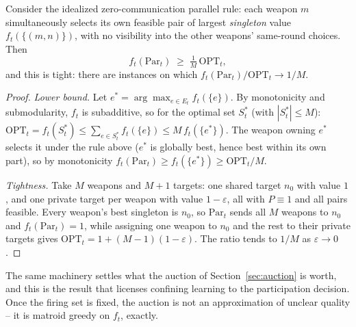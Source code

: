 \begin{proposition}
\label{prop:par-linear}
Consider the idealized zero-communication parallel rule: each weapon $m$ simultaneously selects its own feasible pair of largest \emph{singleton} value $f_t(\{(m,n)\})$, with no visibility into the other weapons' same-round choices. Then
\begin{equation}
f_t(\mathrm{Par}_t) \;\geq\; \tfrac{1}{M}\,\text{OPT}_t,
\end{equation}
and this is tight: there are instances on which $f_t(\mathrm{Par}_t)/\text{OPT}_t \to 1/M$.
\end{proposition}
\begin{proof}
\emph{Lower bound.} Let $e^* = \arg\max_{e \in E_t} f_t(\{e\})$. By monotonicity and submodularity, $f_t$ is subadditive, so for the optimal set $S^*_t$ (with $|S^*_t|\leq M$): $\text{OPT}_t = f_t(S^*_t) \leq \sum_{e\in S^*_t} f_t(\{e\}) \leq M\, f_t(\{e^*\})$. The weapon owning $e^*$ selects it under the rule above ($e^*$ is globally best, hence best within its own part), so by monotonicity $f_t(\mathrm{Par}_t) \geq f_t(\{e^*\}) \geq \text{OPT}_t / M$.

\emph{Tightness.} Take $M$ weapons and $M{+}1$ targets: one shared target $n_0$ with value $1$, and one private target per weapon with value $1-\varepsilon$, all with $P \equiv 1$ and all pairs feasible. Every weapon's best singleton is $n_0$, so $\mathrm{Par}_t$ sends all $M$ weapons to $n_0$ and $f_t(\mathrm{Par}_t)=1$, while assigning one weapon to $n_0$ and the rest to their private targets gives $\text{OPT}_t = 1 + (M{-}1)(1{-}\varepsilon)$. The ratio tends to $1/M$ as $\varepsilon \to 0$.
\end{proof}

The same machinery settles what the auction of Section~\ref{sec:auction} is worth, and this is the result that licenses confining learning to the participation decision. Once the firing set is fixed, the auction is not an approximation of unclear quality -- it is matroid greedy on $f_t$, exactly.

